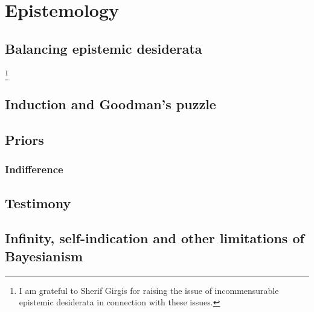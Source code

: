 \def\mychapter{V}

\chapter{Epistemology}\label{ch:epistemology}
\section{Balancing epistemic desiderata}
\footnote{I am grateful to Sherif Girgis for raising the issue of incommensurable epistemic desiderata in connection with these issues.}
\section{Induction and Goodman's puzzle}
\section{Priors}
\subsection{Indifference}
\section{Testimony}
\section{Infinity, self-indication and other limitations of Bayesianism}
\chaptertail 


